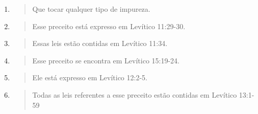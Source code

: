 \begin{enumerate}
\def\labelenumi{\arabic{enumi}.}
\setcounter{enumi}{133}
\item
 \begin{quote}
 Que tocar qualquer tipo de impureza.
 \end{quote}
\item
 \begin{quote}
 Esse preceito está expresso em Levítico 11:29-30.
 \end{quote}
\item
 \begin{quote}
 Essas leis estão contidas em Levítico 11:34.
 \end{quote}
\item
 \begin{quote}
 Esse preceito se encontra em Levítico 15:19-24.
 \end{quote}
\item
 \begin{quote}
 Ele está expresso em Levítico 12:2-5.
 \end{quote}
\item
 \begin{quote}
 Todas as leis referentes a esse preceito estão contidas em Levítico
 13:1-59
 \end{quote}
\end{enumerate}

